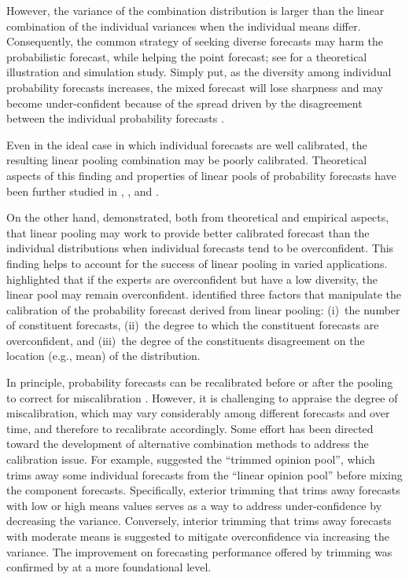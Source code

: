 \documentclass[a4paper,11pt]{article}
\begin{document}
However, the variance of the combination distribution is larger than the linear combination of the individual variances when the individual means differ. Consequently, the common strategy of seeking diverse forecasts may harm the probabilistic forecast, while helping the point forecast; see \citet{Ranjan2010-jl} for a theoretical illustration and simulation study. Simply put, as the diversity among individual probability forecasts increases, the mixed forecast will lose sharpness and may become under-confident because of the spread driven by the disagreement between the individual probability forecasts \citep{Hora2004-fz,Wallis2005-yf,Ranjan2010-jl}.

Even in the ideal case in which individual forecasts are well calibrated, the resulting linear pooling combination may be poorly calibrated. Theoretical aspects of this finding and properties of linear pools of probability forecasts have been further studied in \citet{Hora2004-fz}, \citet{Ranjan2010-jl}, and \citet{Lichtendahl2013-rt}.

On the other hand, \citet{Hora2004-fz} demonstrated, both from theoretical and empirical aspects, that linear pooling may work to provide better calibrated forecast than the individual distributions when individual forecasts tend to be overconfident. This finding helps to account for the success of linear pooling in varied applications. \citet{Jose2014-uh} highlighted that if the experts are overconfident but have a low diversity, the linear pool may remain overconfident. \citet{Lichtendahl2013-rt} identified three factors that manipulate the calibration of the probability forecast derived from linear pooling: (i)~the number of constituent forecasts, (ii)~the degree to which the constituent forecasts are overconfident, and (iii)~the degree of the constituents disagreement on the location (e.g., mean) of the distribution.

In principle, probability forecasts can be recalibrated before or after the pooling to correct for miscalibration \citep{Turner2014-za}. However, it is challenging to appraise the degree of miscalibration, which may vary considerably among different forecasts and over time, and therefore to recalibrate accordingly. Some effort has been directed toward the development of alternative combination methods to address the calibration issue. For example, \citet{Jose2014-uh} suggested the ``trimmed opinion pool'', which trims away some individual forecasts from the ``linear opinion pool'' before mixing the component forecasts. Specifically, exterior trimming that trims away forecasts with low or high means values serves as a way to address under-confidence by decreasing the variance. Conversely, interior trimming that trims away forecasts with moderate means is suggested to mitigate overconfidence via increasing the variance. The improvement on forecasting performance offered by trimming was confirmed by \citet{Grushka-Cockayne2017-dj} at a more foundational level.
\end{document}
